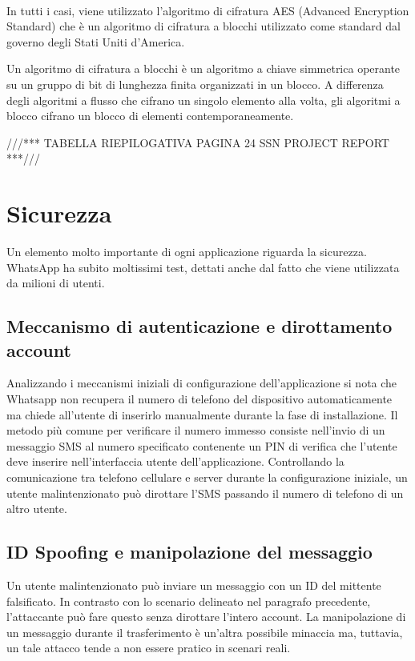\documentclass[a4paper,11pt]{book}
\begin{document}
~

In tutti i casi, viene utilizzato l'algoritmo di cifratura AES (Advanced Encryption Standard) che è un algoritmo di cifratura a blocchi utilizzato come standard dal governo degli Stati Uniti d'America.

Un algoritmo di cifratura a blocchi è un algoritmo a chiave simmetrica operante su un gruppo di bit di lunghezza finita organizzati in un blocco. A differenza degli algoritmi a flusso che cifrano un singolo elemento alla volta, gli algoritmi a blocco cifrano un blocco di elementi contemporaneamente.

///***
TABELLA RIEPILOGATIVA PAGINA 24 SSN PROJECT REPORT
***///

\chapter{Sicurezza}
Un elemento molto importante di ogni applicazione riguarda la sicurezza.
WhatsApp ha subito moltissimi test, dettati anche dal fatto che viene utilizzata da milioni di utenti.

\section{Meccanismo di autenticazione e dirottamento account}
Analizzando i meccanismi iniziali di configurazione dell'applicazione si nota che Whatsapp non recupera il numero di telefono del dispositivo automaticamente ma chiede all'utente di inserirlo manualmente durante la fase di installazione. Il metodo più comune per verificare il numero immesso consiste nell'invio di un messaggio SMS al numero specificato contenente un PIN di verifica che l'utente deve inserire nell'interfaccia utente dell'applicazione. Controllando la comunicazione tra telefono cellulare e server durante la configurazione iniziale, un utente malintenzionato può dirottare l'SMS passando il numero di telefono di un altro utente.

\section{ID Spoofing e manipolazione del messaggio}
Un utente malintenzionato può inviare un messaggio con un ID del mittente falsificato. 
In contrasto con lo scenario delineato nel paragrafo precedente, l'attaccante può fare questo senza dirottare l'intero account. 
La manipolazione di un messaggio durante il trasferimento è un'altra possibile minaccia ma, tuttavia, un tale attacco tende a non essere pratico in scenari reali.
\end{document}
